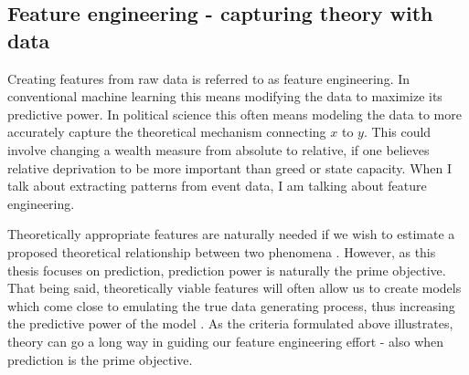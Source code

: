 \documentclass[a4paper]{article}
\begin{document}



\subsection{Feature engineering - capturing theory with data} %

Creating features from raw data is referred to as feature engineering. In conventional machine learning this means modifying the data to maximize its predictive power. In political science this often means modeling the data to more accurately capture the theoretical mechanism connecting $x$ to $y$. This could involve changing a wealth measure from absolute to relative, if one believes relative deprivation to be more important than greed or state capacity. When I talk about extracting patterns from event data, I am talking about feature engineering.\par

Theoretically appropriate features are naturally needed if we wish to estimate a proposed theoretical relationship between two phenomena \citep{Blimes_2006, Cederman_Gleditsch_Buhaug_2013}. However, as this thesis focuses on prediction, prediction power is naturally the prime objective. That being said, theoretically viable features will often allow us to create models which come close to emulating the true data generating process, thus increasing the predictive power of the model \citep[209-211]{Mcelreath_2018}. As the criteria formulated above illustrates, theory can go a long way in guiding our feature engineering effort - also when prediction is the prime objective.\par
\end{document}
